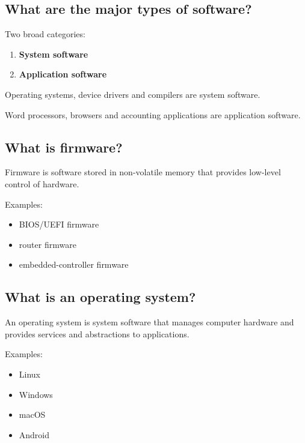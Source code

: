 \medskip

\subsection{What are the major types of software?}

Two broad categories:

\begin{enumerate}
  \item \textbf{System software}
  \item \textbf{Application software}
\end{enumerate}

Operating systems, device drivers and compilers are system software.

Word processors, browsers and accounting applications are application software.

\medskip

\subsection{What is firmware?}

Firmware is software stored in non-volatile memory that provides low-level control of hardware.

Examples:

\begin{itemize}
  \item BIOS/UEFI firmware
  \item router firmware
  \item embedded-controller firmware
\end{itemize}

\medskip

\subsection{What is an operating system?}

An operating system is system software that manages computer hardware and provides services and abstractions to applications.

Examples:

\begin{itemize}
  \item Linux
  \item Windows
  \item macOS
  \item Android
\end{itemize}

